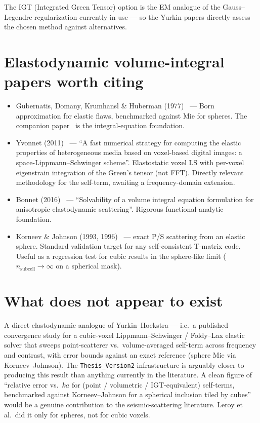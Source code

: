 \documentclass[11pt,a4paper]{article}
\begin{document}
\noindent
The IGT (Integrated Green Tensor) option is the EM analogue of the
Gauss--Legendre regularization currently in use --- so the Yurkin
papers directly assess the chosen method against alternatives.

\section{Elastodynamic volume-integral papers worth citing}

\begin{itemize}[leftmargin=1.5em]
  \item Gubernatis, Domany, Krumhansl \& Huberman
        (1977)~\cite{Gubernatis1977} --- Born approximation for
        elastic flaws, benchmarked against Mie for spheres. The
        companion paper~\cite{Gubernatis1977a} is the integral-equation
        foundation.
  \item Yvonnet (2011)~\cite{Yvonnet2011} --- ``A fast numerical
        strategy for computing the elastic properties of heterogeneous
        media based on voxel-based digital images: a
        space-Lippmann--Schwinger scheme''. Elastostatic voxel LS
        with per-voxel eigenstrain integration of the Green's tensor
        (not FFT). Directly relevant methodology for the self-term,
        awaiting a frequency-domain extension.
  \item Bonnet (2016)~\cite{Bonnet2016} --- ``Solvability of a volume
        integral equation formulation for anisotropic elastodynamic
        scattering''. Rigorous functional-analytic foundation.
  \item Korneev \& Johnson (1993, 1996)~\cite{KorneevJohnson1993,
        KorneevJohnson1996} --- exact P/S scattering from an elastic
        sphere. Standard validation target for any self-consistent
        T-matrix code. Useful as a regression test for cubic results
        in the sphere-like limit ($n_{\text{subcell}} \to \infty$
        on a spherical mask).
\end{itemize}

\section{What does not appear to exist}

A direct elastodynamic analogue of Yurkin--Hoekstra --- i.e.\ a
published convergence study for a cubic-voxel Lippmann--Schwinger /
Foldy--Lax elastic solver that sweeps point-scatterer vs.\
volume-averaged self-term across frequency and contrast, with error
bounds against an exact reference (sphere Mie via Korneev--Johnson).
The \texttt{Thesis\_Version2} infrastructure is arguably closer to
producing this result than anything currently in the literature. A
clean figure of ``relative error vs.\ $ka$ for (point / volumetric /
IGT-equivalent) self-terms, benchmarked against Korneev--Johnson for
a spherical inclusion tiled by cubes'' would be a genuine contribution
to the seismic-scattering literature. Leroy et al.\ did it only for
spheres, not for cubic voxels.
\end{document}
